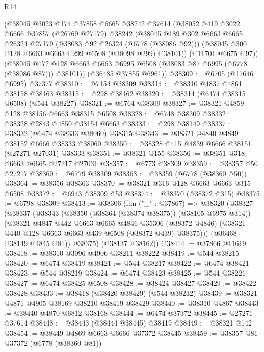 \begin{lexlean}{R14}
\begin{coremodule}
      (@38045
        @3023
        @174
        @37858
        @6665
        @38242
        @37614
        (@38052
          @419
          @3022
          @6666
          @37857
          (@26769 @27179)
          @38242
          (@38045
            @189
            @302
            @6663
            @6665
            @26324
            @27179
            (@38083 @92 @26324 (@6778 (@38086 @92)))
            (@38045 @300 @128 @6663 @6663 @299 @6508 (@38098 @299) @38101))
          (@11701 @6675 @97))
        (@38045 @172 @128 @6663 @6663 @6995 @6508 (@38083 @87 @6995 (@6778 (@38086 @87))) @38101))
      (@36485 @37855 @6961))
@38309 := @6705 (@17646 @6995) @37377
@38310 := @7154 @38309
@38314 := @38310 @4837 @4861 @38158 @38163
@38315 := @298 @38162
@38320 := @38314 (@6474 @38315 @6508) (@544 @38227)
@38321 := @6764 @38309
@38327 := @38321 @4859 @128 @38156 @6663 @38315 @6508
@38328 := @6748 @38309
@38332 := @38328 @2843 @4850 @38154 @6663
@38333 := @298 @38149
@38337 := @38332 (@6474 @38333 @38060) @38315
@38343 := @38321 @4840 @4849 @38152 @6666 @38333 @38060
@38350 := @38328 @415 @4839 @6666 @38151 (@27271 @27031) @38333
@38351 := @38321 @155
@38356 := @38351 @318 @6663 @6665 @27217 @27031
@38357 := @6773 @38309
@38359 := @38357 @50 @27217
@38360 := @6779 @38309
@38363 := @38359 (@6778 (@38360 @50))
@38364 := @38356 @38363
@38370 := @38321 @316 @128 @6663 @6663 @315 @6508
@38372 := @6943 @38309 @53
@38374 := @38370 (@38372 @315)
@38375 := @6798 @38309
@38413 := @38306
    (fun ("_" : @37867) =>
    @38320
      (@38327
        (@38337
          (@38343
            (@38350 (@38364 (@38374 @38375)) (@38105 @6975 @314))
            (@38321
              @4847
              @442
              @6663
              @6665
              @4846
              @35306
              (@38372 @4846)
              (@38321 @440 @128 @6663 @6663 @439 @6508 (@38372 @439) @38375)))
          (@36468 @38149 @4845 @81))
        @38375)
      (@38137 @38162))
@38414 := @37866 @11619
@38418 := @38310 @3096 @4906 @38211 @38222
@38419 := @544 @38215
@38420 := @6474 @38419
@38421 := @544 @38217
@38422 := @6474 @38421
@38423 := @544 @38219
@38424 := @6474 @38423
@38425 := @544 @38221
@38427 := @6474 @38425 @6508
@38428 := @38424 @38427
@38429 := @38422 @38428
@38433 := @38418 (@38420 @38429) (@544 @38232)
@38439 := @38321 @4871 @4905 @38169 @38210 @38419 @38429
@38440 := @38310 @4867
@38443 := @38440 @4870 @6812 @38168
@38444 := @6474 @37372
@38445 := @27271 @37614
@38448 := @38443 (@38444 @38445) @38419
@38449 := @38321 @142
@38454 := @38449 @4869 @6663 @6666 @37372 @38445
@38459 := @38357 @81 @37372 (@6778 (@38360 @81))

\end{coremodule}
\end{lexlean}
